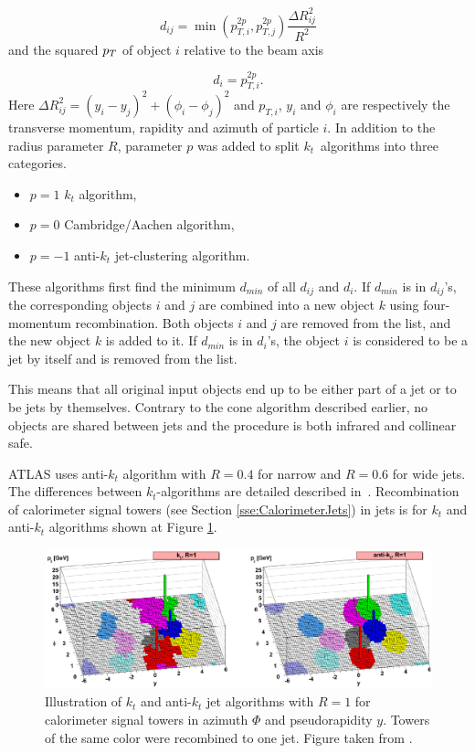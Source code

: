 \begin{equation}
	d_{ij} = \min{\left( p_{T,i}^{2p} , p_{T,j}^{2p} \right)} \frac{\Delta R_{ij}^2}{R^2}
\end{equation}
and the squared $p_{T}$ of object $i$ relative to the beam axis

\begin{equation}
	d_i = p_{T,i}^{2p}.
\end{equation}
Here $\Delta R_{ij}^2 = (y_i - y_j)^2 + (\phi_i - \phi_j)^2$ and $p_{T,i}$,
$y_i$ and $\phi_i$ are respectively the transverse momentum, rapidity and
azimuth of particle $i$. In addition to the radius parameter $R$, parameter $p$
was added to split $k_t$~algorithms into three categories.  
\begin{itemize}
	\item $p = 1$ $k_t$ algorithm,
	\item $p = 0$ Cambridge/Aachen algorithm,
	\item $p = -1$ anti-$k_t$ jet-clustering algorithm.
\end{itemize}

These algorithms first find the minimum $d_{min}$ of all $d_{ij}$ and $d_i$. If
$d_{min}$ is in $d_{ij}$'s, the corresponding objects $i$ and $j$ are combined
into a new object $k$ using four-momentum recombination. Both objects $i$ and
$j$ are removed from the list, and the new object $k$ is added to it. If
$d_{min}$ is in $d_i$'s, the object $i$ is considered to be a jet by itself and
is removed from the list.

This means that all original input objects end up to be either part of a jet or
to be jets by themselves. Contrary to the cone algorithm described earlier, no
objects are shared between jets and the procedure is both infrared and collinear
safe.

ATLAS uses anti-$k_t$ algorithm with $R=0.4$ for narrow and $R=0.6$ for wide
jets. The differences between $k_t$-algorithms are detailed described
in~\cite{ANTIKT}. Recombination of calorimeter signal towers (see Section
\ref{sse:CalorimeterJets}) in jets is for $k_t$ and anti-$k_t$ algorithms shown
at Figure \ref{fig:JetRecombination}.

\begin{figure}[t]
  \centering
  \includegraphics[width=\textwidth]{Chapter2/JetRecombination.png}
  \caption{Illustration of $k_t$ and anti-$k_t$ jet algorithms with $R=1$ for
    calorimeter signal towers in azimuth $\Phi$ and pseudorapidity $y$. Towers of
    the same color were recombined to one jet. Figure taken from
    \cite{JetTheoreticalPictures}.} 
  \label{fig:JetRecombination}
\end{figure}


